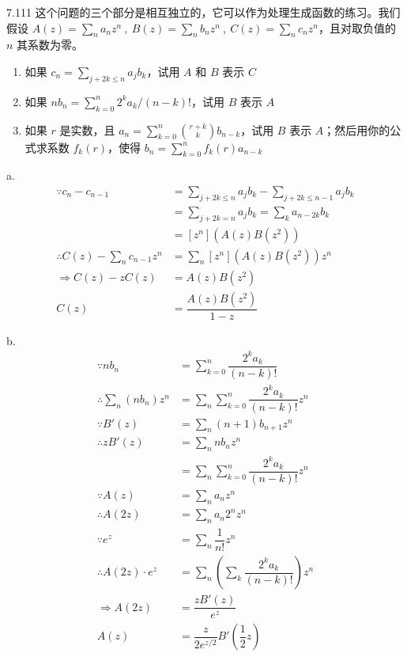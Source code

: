 \begin{problem}{7.11}{1}
  这个问题的三个部分是相互独立的，它可以作为处理生成函数的练习。我们假设 \( A(z) = \sum_n a_n z^n \ , \ B(z) = \sum_n b_n z^n \ , \ C(z) = \sum_n c_n z^n \)，且对取负值的 \( n \) 其系数为零。
  \begin{enumerate}
    \item[a] 如果 \( c_n = \sum_{j+2k \leqslant n}a_j b_k \)，试用 \( A \) 和 \( B \) 表示 \( C \)
    \item[b] 如果 \( n b_n = \sum_{k=0}^n 2^k a_k / (n-k)! \)，试用 \( B \) 表示 \( A \)
    \item[c] 如果 \( r \) 是实数，且 \( \displaystyle a_n = \sum_{k=0}^n \binom{r+k}{k} b_{n-k} \)，试用 \( B \) 表示 \( A \)；然后用你的公式求系数 \( f_k(r) \)，使得 \( b_n = \sum_{k=0}^n f_k(r) a_{n-k} \)
  \end{enumerate}
\end{problem}

a.
\begin{align*}
  \because c_n - c_{n-1} &= \sum_{j+2k \leqslant n} a_j b_k - \sum_{j+2k \leqslant n-1}  a_j b_k \\
  &= \sum_{j+2k = n} a_j b_k = \sum_k a_{n-2k} b_k \\
  &= [z^n] (A(z) B(z^2)) \\[6pt]
  \therefore C(z) - \sum_n c_{n-1} z^n &= \sum_n [z^n] (A(z) B(z^2)) z^n \\
  \Rightarrow C(z) - z C(z) &= A(z) B(z^2) \\[6pt]
  C(z) &= \dfrac{A(z) B(z^2)}{1-z}
\end{align*}

b.
\begin{align*}
  \because n b_n &= \sum_{k=0}^n \dfrac{2^k a_k}{(n-k)!} \\
  \therefore \sum_n (n b_n) z^n &= \sum_n \sum_{k=0}^n \dfrac{2^k a_k}{(n-k)!} z^n \\
  \because B'(z) &= \sum_n (n+1) b_{n+1} z^n \\
  \therefore z B'(z) &= \sum_n n b_n z^n \\
  &= \sum_n \sum_{k=0}^n \dfrac{2^k a_k}{(n-k)!} z^n \\
  \because A(z) &= \sum_n a_n z^n \\
  \therefore A(2z) &= \sum_n a_n 2^n z^{n} \\
  \because e^z &= \sum_n \dfrac{1}{n!} z^n \\
  \therefore A(2z) \cdot e^z &= \sum_n \left( \sum_k \dfrac{2^k a_k}{(n-k)!} \right) z^n \\
  \Rightarrow A(2z) &= \dfrac{z B'(z)}{e^z} \\
  A(z) &= \dfrac{z}{2 e^{z/2}} B'(\dfrac{1}{2} z)
\end{align*}

